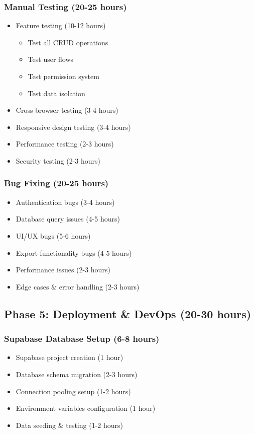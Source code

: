 \documentclass[11pt,a4paper]{article}
\begin{document}
\subsubsection{Manual Testing (20-25 hours)}
\begin{itemize}
    \item Feature testing (10-12 hours)
    \begin{itemize}
        \item Test all CRUD operations
        \item Test user flows
        \item Test permission system
        \item Test data isolation
    \end{itemize}
    \item Cross-browser testing (3-4 hours)
    \item Responsive design testing (3-4 hours)
    \item Performance testing (2-3 hours)
    \item Security testing (2-3 hours)
\end{itemize}

\subsubsection{Bug Fixing (20-25 hours)}
\begin{itemize}
    \item Authentication bugs (3-4 hours)
    \item Database query issues (4-5 hours)
    \item UI/UX bugs (5-6 hours)
    \item Export functionality bugs (4-5 hours)
    \item Performance issues (2-3 hours)
    \item Edge cases \& error handling (2-3 hours)
\end{itemize}

\newpage

\subsection{Phase 5: Deployment \& DevOps (20-30 hours)}

\subsubsection{Supabase Database Setup (6-8 hours)}
\begin{itemize}
    \item Supabase project creation (1 hour)
    \item Database schema migration (2-3 hours)
    \item Connection pooling setup (1-2 hours)
    \item Environment variables configuration (1 hour)
    \item Data seeding \& testing (1-2 hours)
\end{itemize}
\end{document}
